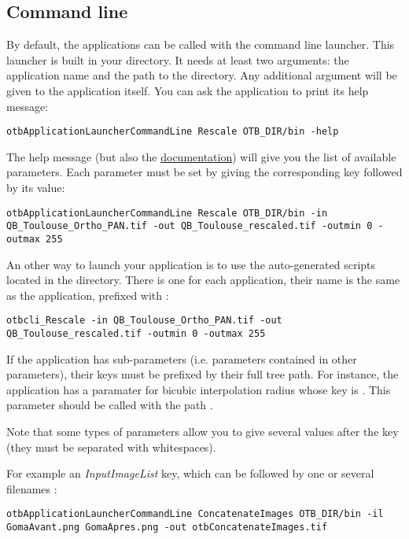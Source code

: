 \subsection{Command line}\label{sec:wrappedAppliCmdLine}
By default, the applications can be called with the command line launcher. This launcher
is built in your  directory. It needs at least two arguments: the 
application name and the path to the  directory. Any additional argument
will be given to the application itself. You can ask the application to print its help
message:
\begin{verbatim}
otbApplicationLauncherCommandLine Rescale OTB_DIR/bin -help
\end{verbatim}
The help message (but also the \href{http://orfeo-toolbox.org/Applications}{documentation})
will give you the list of available parameters. Each parameter must be set by giving the 
corresponding key followed by its value:
\begin{verbatim}
otbApplicationLauncherCommandLine Rescale OTB_DIR/bin -in QB_Toulouse_Ortho_PAN.tif -out QB_Toulouse_rescaled.tif -outmin 0 -outmax 255
\end{verbatim}
An other way to launch your application is to use the auto-generated scripts located in the 
 directory. There is one for each application, their name is the same as 
the application, prefixed with :
\begin{verbatim}
otbcli_Rescale -in QB_Toulouse_Ortho_PAN.tif -out QB_Toulouse_rescaled.tif -outmin 0 -outmax 255
\end{verbatim}

If the application has sub-parameters (i.e. parameters contained in other parameters), 
their keys must be prefixed by their full tree path. For instance, the application 
 has a paramater for bicubic interpolation radius whose key is .
This parameter should be called with the path .

Note that some types of parameters allow you to give several values after the key (they must
be separated with whitespaces).

For example an \emph{InputImageList} key, which can be followed by one or several filenames :

\begin{verbatim}
otbApplicationLauncherCommandLine ConcatenateImages OTB_DIR/bin -il GomaAvant.png GomaApres.png -out otbConcatenateImages.tif
\end{verbatim}


